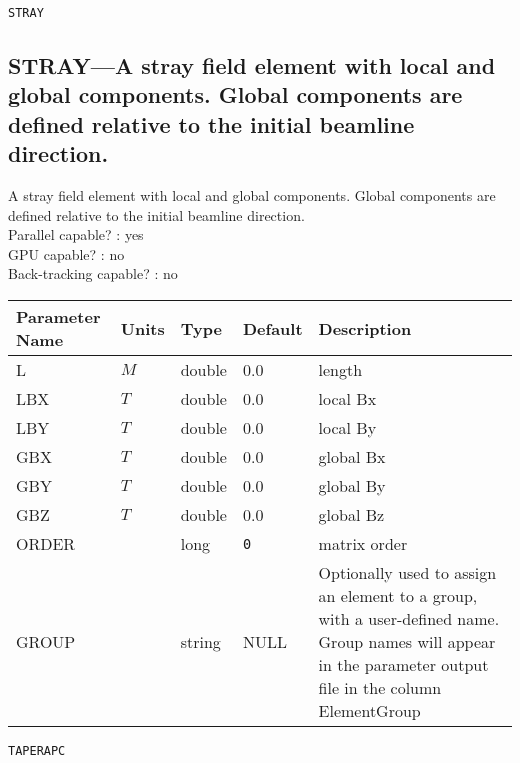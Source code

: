 \vspace*{0.5in}

\newpage
\begin{center}{\Large\verb|STRAY|}\end{center}
\subsection{STRAY---A stray field element with local and global components.  Global components are defined relative to the initial beamline direction.}
A stray field element with local and global components.  Global components are defined relative to the initial beamline direction.
\\
Parallel capable? : yes\\
GPU capable? : no\\
Back-tracking capable? : no\\
\begin{tabular}{|l|l|l|l|p{\descwidth}|} \hline
Parameter Name & Units & Type & Default & Description \\ \hline 
L & $M$ & double &  0.0 & length  \\ \hline 
LBX & $T$ & double &  0.0 & local Bx  \\ \hline 
LBY & $T$ & double &  0.0 & local By  \\ \hline 
GBX & $T$ & double &  0.0 & global Bx  \\ \hline 
GBY & $T$ & double &  0.0 & global By  \\ \hline 
GBZ & $T$ & double &  0.0 & global Bz  \\ \hline 
ORDER &  & long &  \verb|0| & matrix order  \\ \hline 
GROUP &  & string & NULL & Optionally used to assign an element to a group, with a user-defined name.  Group names will appear in the parameter output file in the column ElementGroup  \\ \hline 
\end{tabular}

\vspace*{0.5in}

\newpage
\begin{center}{\Large\verb|TAPERAPC|}\end{center}
